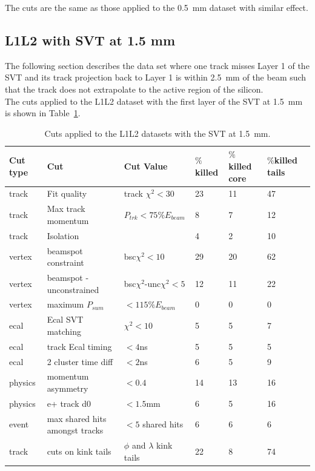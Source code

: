 The cuts are the same as those applied to the 0.5~mm dataset with similar effect.

\subsection{L1L2 with SVT at 1.5 mm}
The following section describes the data set where one track misses Layer 1 of the SVT and its track projection back to Layer 1 is within 2.5~mm of the beam such that the track does not extrapolate to the active region of the silicon.\\
\indent The cuts applied to the L1L2 dataset with the first layer of the SVT at 1.5~mm is shown in Table~\ref{l1l2_cuts_1p5}.

\begin{table}[H]
\caption{Cuts applied to the L1L2 datasets with the SVT at 1.5~mm.}
\label{l1l2_cuts_1p5}
\centering
\begin{tabular}{lllllll}
\toprule
Cut type & Cut & Cut Value &  $\%$killed &  $\%$killed core & $\%$killed tails\\
\midrule
track & Fit quality & track $\chi^{2}<30$ & 23 & 11 & 47 \\
track & Max track momentum &  $P_{trk}<75\%E_{beam}$ & 8 & 7 & 12 \\
track & Isolation &   & 4 & 2 & 10 \\
vertex & beamspot constraint & bsc$\chi^{2}<10$  & 29 & 20 & 62 \\
vertex & beamspot - unconstrained & bsc$\chi^{2}$-unc$\chi^2<5$  & 12 & 11 & 22 \\
vertex & maximum $P_{sum}$ &  $<115\%E_{beam}$ & 0 & 0 & 0 \\
ecal & Ecal SVT matching & $\chi^2<10$  & 5 & 5 & 7 \\
ecal & track Ecal timing & $<4$ns  & 5 & 5 & 5 \\
ecal & 2 cluster time diff & $<2$ns  & 6 & 5 & 9 \\
physics & momentum asymmetry & $<0.4$  & 14 & 13 & 16 \\
physics & e+ track d0 & $<1.5$mm  & 6 & 5 & 16 \\
event & max shared hits amongst tracks & $<5$ shared hits  & 6 & 6 & 6 \\
track & cuts on kink tails & $\phi$ and $\lambda$ kink tails & 22 & 8 & 74 \\
\bottomrule
\end{tabular}
\end{table}

